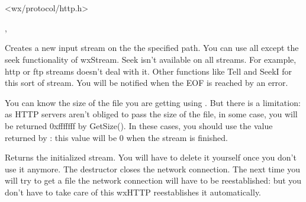 \section{}\label{wxhttp}




<wx/protocol/http.h>


, 


\label{wxhttpgetinputstream}


Creates a new input stream on the the specified path. You can use all except the seek
functionality of wxStream. Seek isn't available on all streams. For example,
http or ftp streams doesn't deal with it. Other functions like Tell and SeekI
for this sort of stream.
You will be notified when the EOF is reached by an error.


You can know the size of the file you are getting using .
But there is a limitation: as HTTP servers aren't obliged to pass the size of
the file, in some case, you will be returned 0xfffffff by GetSize(). In these
cases, you should use the value returned by :
this value will be 0 when the stream is finished.


Returns the initialized stream. You will have to delete it yourself once you
don't use it anymore. The destructor closes the network connection.
The next time you will try to get a file the network connection will have
to be reestablished: but you don't have to take care of this wxHTTP reestablishes it automatically.



